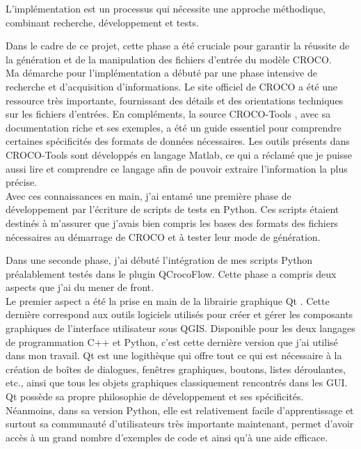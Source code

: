 L'implémentation est un processus qui nécessite une approche méthodique, combinant recherche, développement et tests.

Dans le cadre de ce projet, cette phase a été cruciale pour garantir la réussite de la génération et de la manipulation des fichiers d'entrée du modèle CROCO.\\

Ma démarche pour l'implémentation a débuté par une phase intensive de recherche et d'acquisition d'informations. Le site officiel de CROCO \citep{crocoofficial} a été une ressource très importante, fournissant des détails et des orientations techniques sur les fichiers d'entrées. En compléments, la source \og CROCO-Tools \fg{} \citep{crocotool2007}, avec sa  documentation riche et ses exemples, a été un guide essentiel pour comprendre certaines spécificités des formats de données nécessaires. Les outils présents dans \og CROCO-Tools \fg{} sont développés en langage Matlab, ce qui a réclamé que je puisse aussi lire et comprendre ce langage afin de pouvoir extraire l'information la plus précise.\\

Avec ces connaissances en main, j'ai entamé une première phase de développement par l'écriture de scripts de tests en Python. Ces scripts étaient destinés à m'assurer que j'avais bien compris les bases des formats des fichiers nécessaires au démarrage de CROCO et à tester leur mode de génération.

Dans une seconde phase, j'ai débuté l'intégration de mes scripts Python préalablement testés dans le plugin QCrocoFlow. Cette phase a compris deux aspects que j'ai du mener de front.\\

Le premier aspect a été la prise en main de la librairie graphique Qt \citep{qt}. Cette dernière correspond aux outils logiciels utilisés pour créer et gérer les composants graphiques de l'interface utilisateur sous QGIS. Disponible pour les deux langages de programmation C++ et Python, c'est cette dernière version que j'ai utilisé dans mon travail. Qt est une logithèque qui offre tout ce qui est nécessaire à la création de boîtes de dialogues, fenêtres graphiques, boutons, listes déroulantes, etc., ainsi que tous les objets graphiques classiquement rencontrés dans les GUI. Qt possède sa propre philosophie de développement et ses spécificités. Néanmoins, dans sa version Python, elle est relativement facile d'apprentissage et surtout sa communauté d'utilisateurs très importante maintenant, permet d'avoir accès à un grand nombre d'exemples de code et ainsi qu'à une aide efficace.\\

